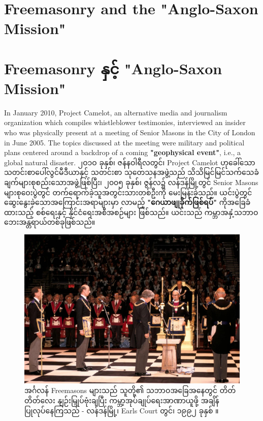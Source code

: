\documentclass[10pt,twocolumn,letterpaper]{article}
\begin{document}
\section{Freemasonry and the "Anglo-Saxon Mission"}
\section{Freemasonry နှင့် "Anglo-Saxon Mission"}

In January 2010, Project Camelot, an alternative media and journalism organization which compiles whistleblower testimonies, interviewed \cite{4,6} an insider who was physically present at a meeting of Senior Masons in the City of London in June 2005. The topics discussed at the meeting were military and political plans centered around a backdrop of a coming \textbf{"geophysical event"}, i.e., a global natural disaster.
၂ဝ၁ဝ ခုနှစ်၊ ဇန်နဝါရီလတွင်၊ Project Camelot ဟုခေါ်သော သတင်းစာပေါ်လွင်မီဒီယာနှင့် သတင်းစာ သုတေသနအဖွဲ့သည် သိသိမြင်မြင်သက်သေခံချက်များစုစည်းသောအဖွဲ့ဖြစ်ပြီး၊ ၂၀၀၅ ခုနှစ်၊ ဇွန်လ၌ လန်ဒန်မြို့တွင် Senior Masons များစုဝေးပွဲတွင် တက်ရောက်ခဲ့သူအတွင်းသားတစ်ဦးကို \cite{4,6} မေးမြန်းခဲ့သည်။ ယင်းပွဲတွင် ဆွေးနွေးခဲ့သောအကြောင်းအရာများမှာ လာမည့် \textbf{"ဂေယာဖျုခိုက်ဖြစ်ရပ်"} ကိုအခြေခံထားသည့် စစ်ရေးနှင့် နိုင်ငံရေးအစီအစဉ်များ ဖြစ်သည်။ ယင်းသည် ကမ္ဘာအနှံ့သဘာဝဘေးအန္တရာယ်တစ်ခုဖြစ်သည်။

\begin{figure}[b]
\begin{center}
\includegraphics[width=1\linewidth]{freemason.jpg}
\end{center}
   \caption{အင်္ဂလန် Freemasons များသည် သူတို့၏ သဘာဝအခြေအနေတွင် တိတ်တိတ်လေး နျဉ်းမြှုပ်ဗုံးချပြီး ကမ္ဘာ့အုပ်ချုပ်ရေးအာဏာယူဖို့ အချိန်ပြုလုပ်နေကြသည် - လန်ဒန်မြို့၊ Earls Court တွင်၊ ၁၉၉၂ ခုနှစ် \cite{5}။}
\label{fig:1}
\label{fig:onecol}
\end{figure}
\end{document}
